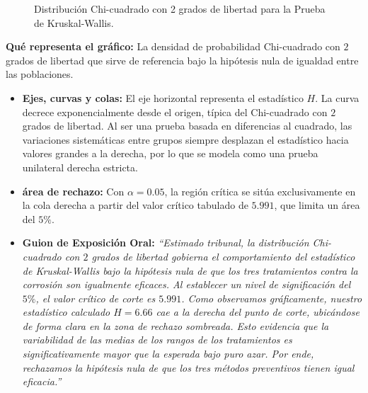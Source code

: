 \documentclass[11pt,a4paper]{article}
\begin{document}
\begin{enumerate}
\begin{figure}[htbp]
    \caption{Distribución Chi-cuadrado con 2 grados de libertad para la Prueba de Kruskal-Wallis.}
    \label{fig:chi_square_kruskal}
    \end{figure}

    \begin{tcolorbox}[colback=blue!2!white,colframe=blue!30!black,title=Análisis Gráfico y Exposición Oral de Kruskal-Wallis]
        \small
        \textbf{Qué representa el gráfico:} La densidad de probabilidad Chi-cuadrado con $2$ grados de libertad que sirve de referencia bajo la hipótesis nula de igualdad entre las poblaciones.
        \begin{itemize}
            \item \textbf{Ejes, curvas y colas:} El eje horizontal representa el estadístico $H$. La curva decrece exponencialmente desde el origen, típica del Chi-cuadrado con $2$ grados de libertad. Al ser una prueba basada en diferencias al cuadrado, las variaciones sistemáticas entre grupos siempre desplazan el estadístico hacia valores grandes a la derecha, por lo que se modela como una prueba unilateral derecha estricta.
            \item \textbf{área de rechazo:} Con $\alpha=0.05$, la región crítica se sitúa exclusivamente en la cola derecha a partir del valor crítico tabulado de $5.991$, que limita un área del $5\%$.
            \item \textbf{Guion de Exposición Oral:} \textit{``Estimado tribunal, la distribución Chi-cuadrado con $2$ grados de libertad gobierna el comportamiento del estadístico de Kruskal-Wallis bajo la hipótesis nula de que los tres tratamientos contra la corrosión son igualmente eficaces. Al establecer un nivel de significación del $5\%$, el valor crítico de corte es $5.991$. Como observamos gráficamente, nuestro estadístico calculado $H = 6.66$ cae a la derecha del punto de corte, ubicándose de forma clara en la zona de rechazo sombreada. Esto evidencia que la variabilidad de las medias de los rangos de los tratamientos es significativamente mayor que la esperada bajo puro azar. Por ende, rechazamos la hipótesis nula de que los tres métodos preventivos tienen igual eficacia.''}
        \end{itemize}
    \end{tcolorbox}


\end{enumerate}
\end{document}
